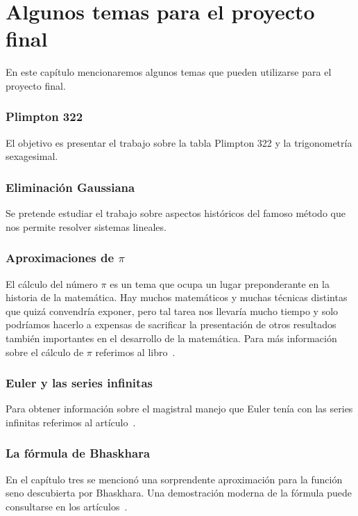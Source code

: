 \chapter{Algunos temas para el proyecto final}

\pagestyle{plain}
\fancyhf{}
\fancyfoot[CE,CO]{\leftmark}
\fancyfoot[LE,RO]{\thepage}


En este capítulo mencionaremos algunos temas
que pueden utilizarse para el proyecto final. 

\subsection*{Plimpton 322}

El objetivo es presentar el trabajo \cite{MR3716328} sobre la tabla Plimpton 322 y
la trigonometría sexagesimal. 

\subsection*{Eliminación Gaussiana}

Se pretende estudiar el trabajo \cite{MR2775854} sobre aspectos históricos del famoso 
método que nos permite 
resolver sistemas lineales.

\subsection*{Aproximaciones de $\pi$}

El cálculo del número $\pi$ es un tema que ocupa un lugar preponderante en la
historia de la matemática. Hay muchos matemáticos y muchas técnicas distintas
que quizá convendría exponer, pero tal tarea nos llevaría mucho tiempo y solo
podríamos hacerlo a expensas de sacrificar la presentación de otros resultados
también importantes en el desarrollo de la matemática. Para más información
sobre el cálculo de $\pi$ referimos al libro~\cite{MR0449960}. 

\subsection*{Euler y las series infinitas}

Para obtener información sobre el magistral manejo que Euler tenía con las series
infinitas referimos al artículo~\cite{MR2338363}.

\subsection*{La fórmula de Bhaskhara}

En el capítulo tres se mencionó una sorprendente aproximación 
para la función seno descubierta por Bhaskhara. 
Una demostración moderna de la fórmula puede
consultarse en los artículos~\cite{MR1108101,MR2793182}.